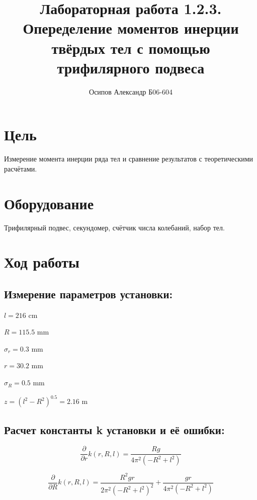 \documentclass[12pt]{extarticle}
\begin{document}
\author{Осипов Александр Б06-604}
\title{Лабораторная работа 1.2.3. Опеределение моментов инерции твёрдых тел с помощью трифилярного подвеса}
\maketitle
\section{Цель}

Измерение момента инерции ряда тел и сравнение результатов с теоретическими расчётами.

\section{Оборудование}

Трифилярный подвес, секундомер, счётчик числа колебаний, набор тел.

\section{Ход работы}
\subsection{Измерение параметров установки:}

\vspace{5mm}

$l = 216 \text{ cm}$

$R = 115.5 \text{ mm}$

$\sigma_r = 0.3 \text{ mm}$

$r = 30.2 \text{ mm}$

$\sigma_R = 0.5 \text{ mm}$ 

$z = (l^2 - R^2)^{0.5} =  2.16 \text{ m}$

\newpage

\subsection{Расчет константы k установки и её ошибки:}
$$\displaystyle \frac{\partial}{\partial r} k{\left(r,R,l \right)} = \frac{R g}{4 \pi^{2} \left(- R^{2} + l^{2}\right)}$$
\vspace{3mm}

$$\displaystyle \frac{\partial}{\partial R} k{\left(r,R,l \right)} = \frac{R^{2} g r}{2 \pi^{2} \left(- R^{2} + l^{2}\right)^{2}} + \frac{g r}{4 \pi^{2} \left(- R^{2} + l^{2}\right)}$$
\end{document}
